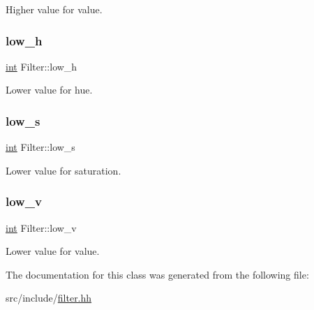 Higher value for value. 

\mbox{\label{class_filter_acc9169ecdd67e37c512e7e50b2257805}} 
\subsubsection{\texorpdfstring{low\_h}{low\_h}}
{\footnotesize\ttfamily \mbox{\hyperlink{draw_8hh_aa620a13339ac3a1177c86edc549fda9b}{int}} Filter\+::low\+\_\+h}



Lower value for hue. 

\mbox{\label{class_filter_a4eb6f35c78627a310f1476d37917758c}} 
\subsubsection{\texorpdfstring{low\_s}{low\_s}}
{\footnotesize\ttfamily \mbox{\hyperlink{draw_8hh_aa620a13339ac3a1177c86edc549fda9b}{int}} Filter\+::low\+\_\+s}



Lower value for saturation. 

\mbox{\label{class_filter_a80dc06dbdcdec4106c05793affc9738c}} 
\subsubsection{\texorpdfstring{low\_v}{low\_v}}
{\footnotesize\ttfamily \mbox{\hyperlink{draw_8hh_aa620a13339ac3a1177c86edc549fda9b}{int}} Filter\+::low\+\_\+v}



Lower value for value. 



The documentation for this class was generated from the following file\+:\begin{DoxyCompactItemize}
\item 
src/include/\mbox{\hyperlink{filter_8hh}{filter.\+hh}}\end{DoxyCompactItemize}
